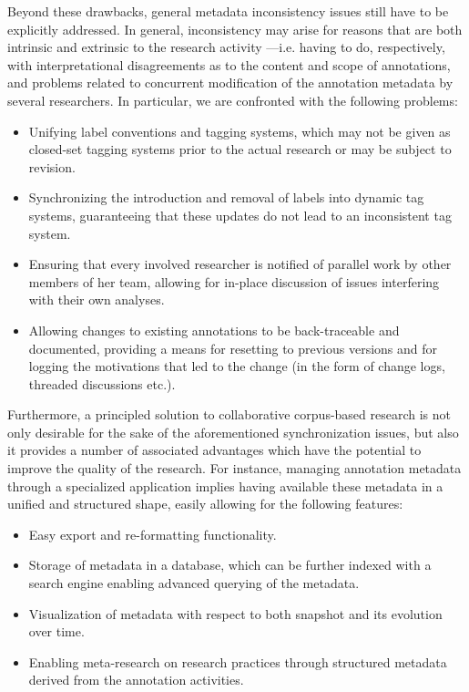 \documentclass{sig-alternate}
\begin{document}
Beyond these drawbacks, general metadata inconsistency issues still have to be explicitly addressed.
In general, inconsistency may arise for reasons that are both intrinsic and extrinsic to the
research activity ---i.e. having to do, respectively, with interpretational disagreements
as to the content and scope of annotations, and problems related to concurrent modification of
the annotation metadata by several researchers. In particular, we are confronted with the
following problems:
\begin{itemize}
\item Unifying label conventions and tagging systems, which may not be given as closed-set
  tagging systems prior to the actual research or may be subject to revision.
\item Synchronizing the introduction and removal of labels into dynamic tag systems,
  guaranteeing that these updates do not lead to an inconsistent tag system.
\item Ensuring that every involved researcher is notified of parallel work by other members
  of her team, allowing for in-place discussion of issues interfering with their own analyses.
\item Allowing changes to existing annotations to be back-traceable and documented, providing
  a means for resetting to previous versions and for logging the motivations
  that led to the change (in the form of change logs, threaded discussions etc.).
\end{itemize}

Furthermore, a principled solution to collaborative corpus-based research is not only
desirable for the sake of the aforementioned synchronization issues, but also it provides
a number of associated advantages which have the potential to improve the quality of the research.
For instance, managing annotation metadata through a specialized application implies
having available these metadata in a unified and structured shape, easily allowing
for the following features:

\begin{itemize}
\item Easy export and re-formatting functionality.
\item Storage of metadata in a database, which can be further indexed with a search engine
  enabling advanced querying of the metadata.
\item Visualization of metadata with respect to both snapshot and its evolution over time.
\item Enabling meta-research on research practices through structured metadata derived
  from the annotation activities.
\end{itemize}
\end{document}
